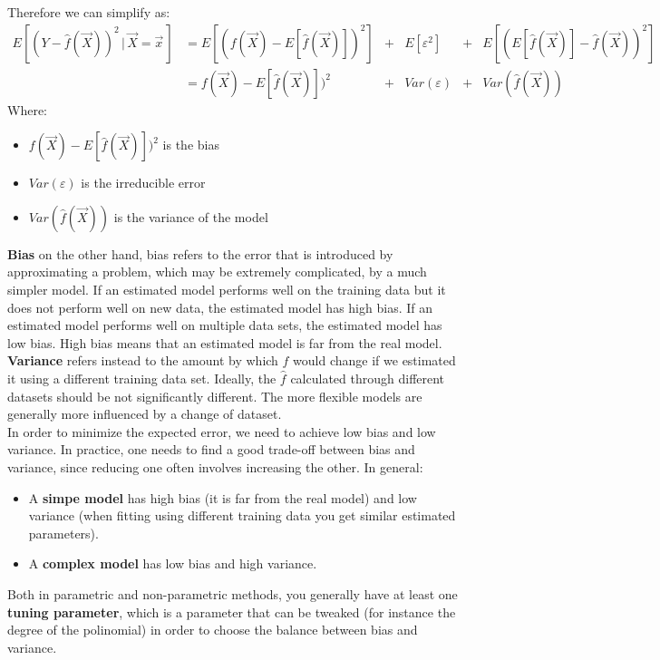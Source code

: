       Therefore we can simplify as:
      \begin{align*}
      E[(Y-\hat{f}(\vec{X}))^2 \,|\, \vec{X} = \vec{x}\,]
      & = E[(f(\vec{X}) - E[\hat{f}(\vec{X})])^2] &+ &E[\varepsilon^2] &+ &E[(E[\hat{f}(\vec{X})] - \hat{f}(\vec{X}))^2] \\
      & = f(\vec{X}) - E[\hat{f}(\vec{X})])^2 &+ &Var(\varepsilon) &+ &Var(\hat{f}(\vec{X})) 
      \end{align*} 
      Where:
      \begin{itemize}
        \item $f(\vec{X}) - E[\hat{f}(\vec{X})])^2$ is the bias
        \item $Var(\varepsilon)$ is the irreducible error
        \item $Var(\hat{f}(\vec{X}))$ is the variance of the model
      \end{itemize}
      \textbf{Bias} on the other hand, bias refers to the error that is introduced by approximating a problem, which may be extremely complicated, by a much
simpler model. If an estimated model performs well on the training data but it does not perform well on new data, the estimated model has high bias. If an estimated model performs well on multiple data sets, the estimated model has low bias. High bias means that an estimated model is far from the real model. \\
      \textbf{Variance} refers instead to the amount by which $\hat{f}$ would change if we
estimated it using a different training data set. Ideally, the $\hat{f}$ calculated 
through different datasets should be not significantly different. The more flexible models are generally more influenced
by a change of dataset. \\
      In order to minimize the expected error, we need to achieve low bias and low variance. In practice, one needs to find a good trade-off between bias and variance, since reducing one often involves increasing the other. In general:
      \begin{itemize}
        \item A \textbf{simpe model} has high bias (it is far from the real model) and low variance (when fitting using different training data you get similar estimated parameters).
        \item A \textbf{complex model} has low bias and high variance.
      \end{itemize}
      Both in parametric and non-parametric methods, you generally have at least one \textbf{tuning parameter}, which is a parameter that can be tweaked (for instance the degree of the polinomial) in order to choose the balance between bias and variance.
